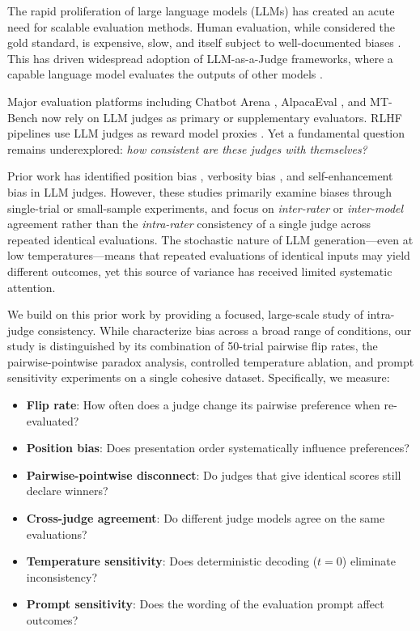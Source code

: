 \documentclass{ijclclp}
\begin{document}
The rapid proliferation of large language models (LLMs) has created an acute need for scalable evaluation methods. Human evaluation, while considered the gold standard, is expensive, slow, and itself subject to well-documented biases \citep{clark2021all}. This has driven widespread adoption of LLM-as-a-Judge frameworks, where a capable language model evaluates the outputs of other models \citep{zheng2023judging}.

Major evaluation platforms including Chatbot Arena \citep{chiang2024chatbot}, AlpacaEval \citep{dubois2024alpacafarm}, and MT-Bench \citep{zheng2023judging} now rely on LLM judges as primary or supplementary evaluators. RLHF pipelines use LLM judges as reward model proxies \citep{ouyang2022training, bai2022constitutional}. Yet a fundamental question remains underexplored: \textit{how consistent are these judges with themselves?}

Prior work has identified position bias \citep{wang2023large, zheng2023judging}, verbosity bias \citep{zheng2023judging}, and self-enhancement bias \citep{zheng2023judging} in LLM judges. However, these studies primarily examine biases through single-trial or small-sample experiments, and focus on \textit{inter-rater} or \textit{inter-model} agreement rather than the \textit{intra-rater} consistency of a single judge across repeated identical evaluations. The stochastic nature of LLM generation---even at low temperatures---means that repeated evaluations of identical inputs may yield different outcomes, yet this source of variance has received limited systematic attention.

We build on this prior work by providing a focused, large-scale study of intra-judge consistency. While \citet{stureborg2024large} characterize bias across a broad range of conditions, our study is distinguished by its combination of 50-trial pairwise flip rates, the pairwise-pointwise paradox analysis, controlled temperature ablation, and prompt sensitivity experiments on a single cohesive dataset. Specifically, we measure:

\begin{itemize}[nosep]
    \item \textbf{Flip rate}: How often does a judge change its pairwise preference when re-evaluated?
    \item \textbf{Position bias}: Does presentation order systematically influence preferences?
    \item \textbf{Pairwise-pointwise disconnect}: Do judges that give identical scores still declare winners?
    \item \textbf{Cross-judge agreement}: Do different judge models agree on the same evaluations?
    \item \textbf{Temperature sensitivity}: Does deterministic decoding ($t=0$) eliminate inconsistency?
    \item \textbf{Prompt sensitivity}: Does the wording of the evaluation prompt affect outcomes?
\end{itemize}
\end{document}
